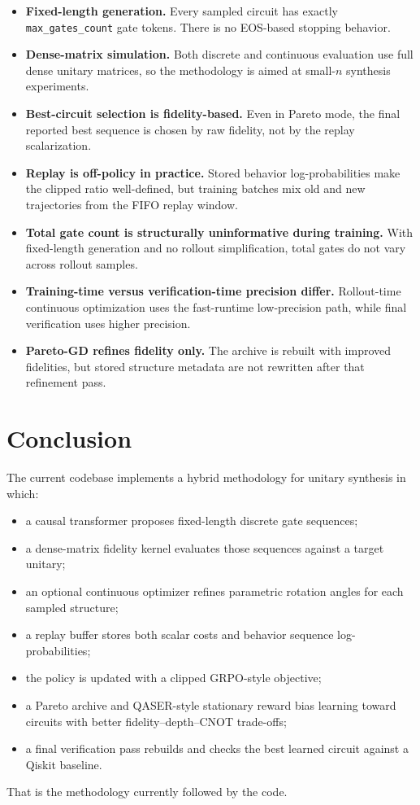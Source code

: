 \documentclass[11pt]{article}
\begin{document}
\begin{itemize}[leftmargin=*]
\item \textbf{Fixed-length generation.} Every sampled circuit has exactly \texttt{max\_gates\_count} gate tokens. There is no EOS-based stopping behavior.
\item \textbf{Dense-matrix simulation.} Both discrete and continuous evaluation use full dense unitary matrices, so the methodology is aimed at small-$n$ synthesis experiments.
\item \textbf{Best-circuit selection is fidelity-based.} Even in Pareto mode, the final reported best sequence is chosen by raw fidelity, not by the replay scalarization.
\item \textbf{Replay is off-policy in practice.} Stored behavior log-probabilities make the clipped ratio well-defined, but training batches mix old and new trajectories from the FIFO replay window.
\item \textbf{Total gate count is structurally uninformative during training.} With fixed-length generation and no rollout simplification, total gates do not vary across rollout samples.
\item \textbf{Training-time versus verification-time precision differ.} Rollout-time continuous optimization uses the fast-runtime low-precision path, while final verification uses higher precision.
\item \textbf{Pareto-GD refines fidelity only.} The archive is rebuilt with improved fidelities, but stored structure metadata are not rewritten after that refinement pass.
\end{itemize}

\section{Conclusion}

The current codebase implements a hybrid methodology for unitary synthesis in which:
\begin{itemize}[leftmargin=*]
\item a causal transformer proposes fixed-length discrete gate sequences;
\item a dense-matrix fidelity kernel evaluates those sequences against a target unitary;
\item an optional continuous optimizer refines parametric rotation angles for each sampled structure;
\item a replay buffer stores both scalar costs and behavior sequence log-probabilities;
\item the policy is updated with a clipped GRPO-style objective;
\item a Pareto archive and QASER-style stationary reward bias learning toward circuits with better fidelity--depth--CNOT trade-offs;
\item a final verification pass rebuilds and checks the best learned circuit against a Qiskit baseline.
\end{itemize}

That is the methodology currently followed by the code.
\end{document}
